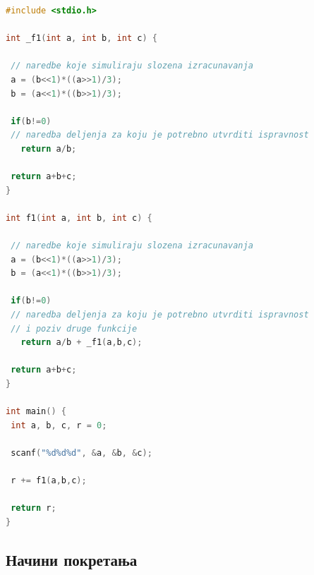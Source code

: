\documentclass[12pt,oneside]{memoir}
\begin{document}
\begin{lstlisting}[basicstyle=\fontsize{12}{4}\selectfont,language=C,frame=single,caption=Пример програма друге категорије (друга верзија),label=primer_nivo_2t]
#include <stdio.h>

int _f1(int a, int b, int c) {

 // naredbe koje simuliraju slozena izracunavanja 
 a = (b<<1)*((a>>1)/3);
 b = (a<<1)*((b>>1)/3);
 
 if(b!=0)
 // naredba deljenja za koju je potrebno utvrditi ispravnost
   return a/b;
   
 return a+b+c;
}

int f1(int a, int b, int c) {

 // naredbe koje simuliraju slozena izracunavanja 
 a = (b<<1)*((a>>1)/3);
 b = (a<<1)*((b>>1)/3);
 
 if(b!=0)
 // naredba deljenja za koju je potrebno utvrditi ispravnost
 // i poziv druge funkcije 
   return a/b + _f1(a,b,c);
   
 return a+b+c;
}

int main() {
 int a, b, c, r = 0;
 
 scanf("%d%d%d", &a, &b, &c);
 
 r += f1(a,b,c);
 
 return r;
}


\end{lstlisting}



\subsection{Начини покретања}
%
%
\end{document}
